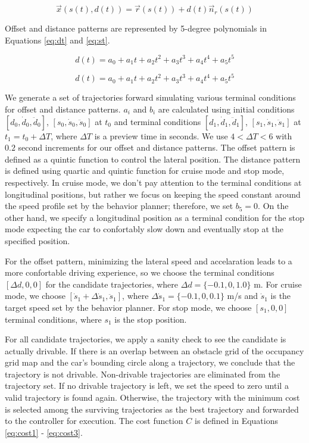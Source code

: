 \begin{equation}
    \vec{x}(s(t), d(t)) = \vec{r}(s(t)) + d(t)\vec{n}_r(s(t))
\label{eq:trajectory}
\end{equation}

Offset and distance patterns are represented by 5-degree polynomials
in Equations \eqref{eq:dt} and \eqref{eq:st}.

\begin{equation}
    d(t) = a_0 + a_1t + a_2t^2 + a_3t^3 + a_4t^4 + a_5t^5
\label{eq:dt}
\end{equation}

\begin{equation}
    d(t) = a_0 + a_1t + a_2t^2 + a_3t^3 + a_4t^4 + a_5t^5
\label{eq:st}
\end{equation}

We generate a set of trajectories forward simulating various terminal
conditions for offset and distance patterns. $a_i$ and $b_i$ are calculated
using initial conditions $[d_0, \dot{d}_0, \ddot{d}_0]$, $[s_0, \dot{s}_0,
\ddot{s}_0]$ at $t_0$ and terminal conditions $[d_1, \dot{d}_1, \ddot{d}_1]$,
$[s_1, \dot{s}_1, \ddot{s}_1]$ at $t_1 = t_0 + \Delta T$, where $\Delta T$ is a
preview time in seconds. We use $4 < \Delta T < 6$ with $0.2$ second increments
for our offset and distance patterns. The offset pattern is defined as a
quintic function to control the lateral position.  The distance pattern is
defined using quartic and quintic function for cruise mode and stop mode,
respectively. In cruise mode, we don't pay attention to the terminal conditions
at longitudinal positions, but rather we focus on keeping the speed constant
around the speed profile set by the behavior planner; therefore, we set $b_5 =
0$. On the other hand, we specify a longitudinal position as a terminal
condition for the stop mode expecting the car to confortably slow down and
eventually stop at the specified position.

For the offset pattern, minimizing the lateral speed and accelaration leads to
a more confortable driving experience, so  we choose the terminal conditions
$[\Delta d, 0, 0]$ for the candidate trajectories, where $\Delta d = \{-0.1, 0,
1.0\}$ m. For cruise mode, we choose $[\dot{s}_1 + \Delta \dot{s}_1,
\ddot{s}_1]$, where $\Delta \dot{s}_1 = \{-0.1, 0, 0.1\}$ m/s and $\dot{s}_1$
is the target speed set by the behavior planner. For stop mode, we choose
$[s_1, 0, 0]$ terminal conditions, where $s_1$ is the stop position.

For all candidate trajectories, we apply a sanity check to see the candidate is
actually drivable. If there is an overlap between an obstacle grid of the
occupancy grid map and the car's bounding circle along a trajectory, we
conclude that the trajectory is not drivable. Non-drivable trajectories are
eliminated from the trajectory set. If no drivable trajectory is left, we set
the speed to zero until a valid trajectory is found again. Otherwise, the
trajectory with the minimum cost is selected among the surviving trajectories
as the best trajectory and forwarded to the controller for execution.
The cost function $C$ is defined in Equations \eqref{eq:cost1} -
\eqref{eq:cost3}.

